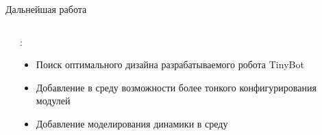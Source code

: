 \documentclass[11pt, aspectratio=169]{beamer}
\begin{document}
\begin{frame}{Дальнейшая работа}
    \begin{columns}[onlytextwidth]
        \begin{column}{0.48\textwidth}
    
        \end{column}
        \begin{column}{0.5\textwidth}
            :
            \begin{itemize}
                \item Поиск оптимального дизайна разрабатываемого робота TinyBot
                \item Добавление в среду возможности более тонкого конфигурирования модулей
                \item Добавление моделирования динамики в среду
            \end{itemize}
        \end{column}
    \end{columns}
\end{frame}
\end{document}
